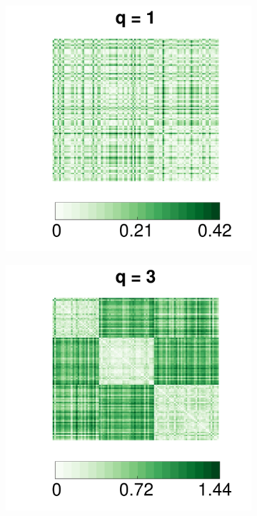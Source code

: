 \documentclass[12pt]{article}
\theoremstyle{definition}
\begin{document}
	\begin{figure}[H]
		\centering
		\begin{subfigure}[b]{0.23\textwidth}
			\includegraphics[width=\textwidth]{../Figure/E1.pdf}
			\caption{}
			\label{fig:e1}
		\end{subfigure}
		\begin{subfigure}[b]{0.23\textwidth}
			\includegraphics[width=\textwidth]{../Figure/E3.pdf}

\end{subfigure}
\end{figure}
\end{document}
